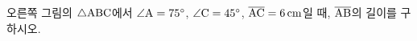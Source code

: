 \noindent\begin{minipage}[t]{0.58\linewidth}\vspace{0pt}\raggedright 오른쪽 그림의 $\triangle\mathrm{ABC}$에서 $\angle\mathrm{A}=75^\circ$, $\angle\mathrm{C}=45^\circ$, $\overline{\mathrm{AC}}=6\,\mathrm{cm}$일 때, $\overline{\mathrm{AB}}$의 길이를 구하시오.\end{minipage}\hfill\begin{minipage}[t]{0.4\linewidth}\vspace{0pt}\centering \resizebox{\ifdim\width>\linewidth\linewidth\else\width\fi}{!}{}\end{minipage}\par
